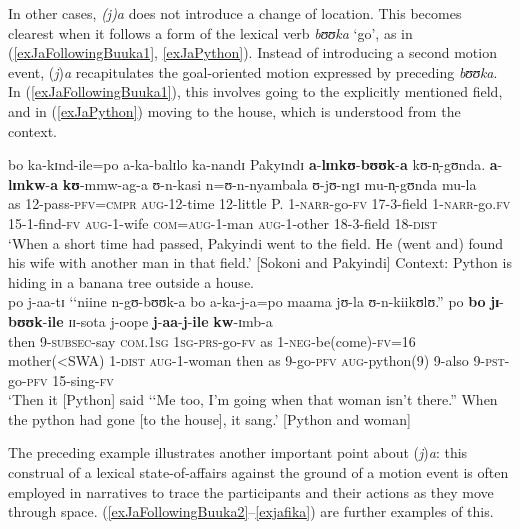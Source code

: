 In other cases, \textit{(j)a} does not introduce a change of location. This becomes clearest when it follows a form of the lexical verb \textit{bʊʊka} \lq go', as in (\ref{exJaFollowingBuuka1}, \ref{exJaPython}). Instead of introducing a second motion event, (\textit{j})\textit{a} recapitulates the goal-oriented motion expressed by preceding \textit{bʊʊka}. In (\ref{exJaFollowingBuuka1}), this involves going to the explicitly mentioned field, and in (\ref{exJaPython}) moving to the house, which is understood from the context.
\begin{exe}
\ex \label{exJaFollowingBuuka1}\gll bo ka-kɪnd-ile=po a-ka-balɪlo ka-nandɪ Pakyɪndɪ \textbf{a}-\textbf{lɪnkʊ}-\textbf{bʊʊk}-\textbf{a} kʊ-n̩-gʊnda. \textbf{a}-\textbf{lɪnkw}-\textbf{a} \textbf{kʊ}-mmw-ag-a ʊ-n-kasi n=ʊ-n-nyambala ʊ-jʊ-ngɪ mu-n̩-gʊnda mu-la\\
as 12-pass-\textsc{pfv}=\textsc{cmpr} \textsc{aug}-12-time 12-little P. 1-\textsc{narr}-go-\textsc{fv} 17-3-field 1-\textsc{narr}-go.\textsc{fv} 15-1-find-\textsc{fv} \textsc{aug}-1-wife \textsc{com}=\textsc{aug}-1-man \textsc{aug}-1-other 18-3-field 18-\textsc{dist}\\
\glt `When a short time had passed, Pakyindi went to the field. He (went and) found his wife with another man in that field.' [Sokoni and Pakyindi]
\ex \label{exJaPython}
Context: Python is hiding in a banana tree outside a house.\\
\gll po j-aa-tɪ \textup{\lq\lq}niine n-gʊ-bʊʊk-a bo a-ka-j-a=po maama jʊ-la ʊ-n-kiikʊlʊ.\textup{''} po \textbf{bo} \textbf{jɪ}-\textbf{bʊʊk}-\textbf{ile} ɪɪ-sota j-oope \textbf{j}-\textbf{aa}-\textbf{j}-\textbf{ile} \textbf{kw}-ɪmb-a\\
then 9-\textsc{subsec}-say \phantom{\lq\lq}\textsc{com.1sg} \textsc{1sg}-\textsc{prs}-go-\textsc{fv} as 1-\textsc{neg}-be(come)-\textsc{fv}=16 mother(<SWA) 1-\textsc{dist} \textsc{aug}-1-woman then as 9-go-\textsc{pfv} \textsc{aug}-python(9) 9-also 9-\textsc{pst}-go-\textsc{pfv} 15-sing-\textsc{fv}\\
\glt \lq Then it [Python] said \lq\lq Me too, I'm going when that woman isn't there.''  ‎‎When the python had gone [to the house], it sang.' [Python and woman]
\end{exe}
 
The preceding example illustrates another important point about (\textit{j})\textit{a}: this construal of a lexical state-of-affairs against the ground of a motion event is often employed in narratives to trace the participants and their actions as they move through space. (\ref{exJaFollowingBuuka2}--\ref{exjafika}) are further examples of this.

